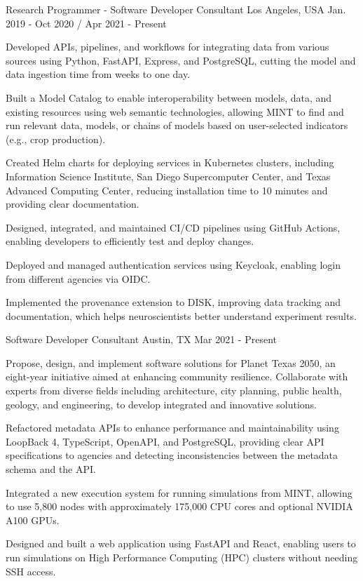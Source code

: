 \begin{cventries}
   {Research Programmer - Software Developer Consultant}
  {Los Angeles, USA} {Jan. 2019 - Oct 2020 / Apr 2021 - Present} { \begin{cvitems}\item{Developed APIs, pipelines, and workflows for integrating data from various sources using Python, FastAPI, Express, and PostgreSQL, cutting the model and data ingestion time from weeks to one day.} \item{Built a Model Catalog to enable interoperability between models, data, and existing resources using web semantic technologies, allowing MINT to find and run relevant data, models, or chains of models based on user-selected indicators (e.g., crop production).} \item{Created Helm charts for deploying services in Kubernetes clusters, including Information Science Institute, San Diego Supercomputer Center, and Texas Advanced Computing Center, reducing installation time to 10 minutes and providing clear documentation.} \item{Designed, integrated, and maintained CI/CD pipelines using GitHub Actions, enabling developers to efficiently test and deploy changes.} \item{Deployed and managed authentication services using Keycloak, enabling login from different agencies via OIDC.} \item{Implemented the provenance extension to DISK, improving data tracking and documentation, which helps neuroscientists better understand experiment results.}\end{cvitems} }
   {Software Developer Consultant} {Austin, TX}
  {Mar 2021 - Present} { \begin{cvitems}\item{Propose, design, and implement software solutions for Planet Texas 2050, an eight-year initiative aimed at enhancing community resilience. Collaborate with experts from diverse fields including architecture, city planning, public health, geology, and engineering, to develop integrated and innovative solutions.} \item{Refactored metadata APIs to enhance performance and maintainability using LoopBack 4, TypeScript, OpenAPI, and PostgreSQL, providing clear API specifications to agencies and detecting inconsistencies between the metadata schema and the API.} \item{Integrated a new execution system for running simulations from MINT, allowing to use 5,800 nodes with approximately 175,000 CPU cores and optional NVIDIA A100 GPUs.} \item{Designed and built a web application using FastAPI and React, enabling users to run simulations on High Performance Computing (HPC) clusters without needing SSH access.}\end{cvitems} }


\end{cventries}

